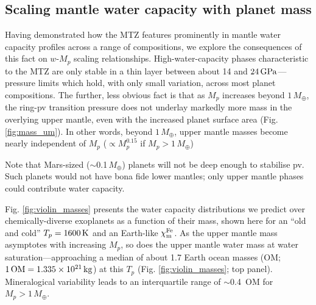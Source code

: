 \documentclass[fleqn,usenatbib]{mnras}
\newcommand{\todo}[1]{\textit{\textcolor{violet}{{#1}}}}
\newcommand{\coreeff}{$\chi^{\rm Fe}_{\rm m}$}
\begin{document}

\subsection{Scaling mantle water capacity with planet mass}

Having demonstrated how the MTZ features prominently in mantle water capacity profiles across a range of compositions, we explore the consequences of this fact on $w$-$M_p$ scaling relationships. High-water-capacity phases characteristic to the MTZ are only stable in a thin layer between about 14 and $24\,{\rm GPa}$---pressure limits which hold, with only small variation, across most planet compositions. %
The further, less obvious fact is that as $M_p$ increases beyond $1\,M_\oplus$, the ring-pv transition pressure does not underlay markedly more mass in the overlying upper mantle, even with the increased planet surface area (Fig. \ref{fig:mass_um}). In other words, beyond $1\,M_\oplus$, upper mantle masses become nearly independent of $M_p$ ($\propto M_p^{0.15}$ if $M_p > 1 \, M_\oplus$) %

Note that Mars-sized ($\sim$0.1$\,M_\oplus$) planets will not be deep enough to stabilise pv. Such planets would not have bona fide lower mantles; only upper mantle phases could contribute water capacity.


Fig. \ref{fig:violin_masses} presents the water capacity distributions we predict over chemically-diverse exoplanets as a function of their mass, shown here for an ``old and cold'' $T_p = 1600\,{\rm K}$ and an Earth-like \coreeff. As the upper mantle mass asymptotes with increasing $M_p$, so does the upper mantle water mass at water saturation---approaching a median of about 1.7 Earth ocean masses (OM; $1\,{\rm OM} = 1.335\times 10^{21}\,{\rm kg}$) at this $T_p$ (Fig. \ref{fig:violin_masses}; top panel). Mineralogical variability leads to an interquartile range of $\sim$0.4~OM for $M_p > 1\, M_\oplus$. 
\end{document}
